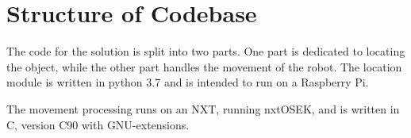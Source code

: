 \section{Structure of Codebase}
The code for the solution is split into two parts.
One part is dedicated to locating the object, while the other part handles the movement of the robot.
The location module is written in python 3{.}7 and is intended to run on a Raspberry Pi.

The movement processing runs on an NXT, running nxtOSEK, and is written in C, version C90 with GNU-extensions.



